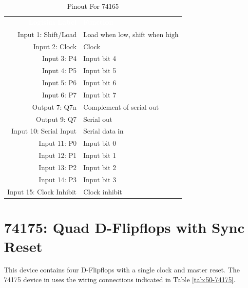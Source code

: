 \begin{table}[H]
	\sffamily
	\newcommand{\head}[1]{\textcolor{white}{\textbf{#1}}}		
	\begin{center}
		\begin{tabular}{rl} 
			\rowcolor{black!75}
			\head{Logisim Label} & \head{Function} \\
			Input 1: Shift/Load     & Load when low, shift when high \\
			Input 2: Clock          & Clock                          \\
			Input 3: P4             & Input bit 4                    \\
			Input 4: P5             & Input bit 5                    \\
			Input 5: P6             & Input bit 6                    \\
			Input 6: P7             & Input bit 7                    \\
			Output 7: Q7n           & Complement of serial out       \\
			Output 9: Q7            & Serial out                     \\
			Input 10: Serial Input  & Serial data in                 \\
			Input 11: P0            & Input bit 0                    \\
			Input 12: P1            & Input bit 1                    \\
			Input 13: P2            & Input bit 2                    \\
			Input 14: P3            & Input bit 3                    \\
			Input 15: Clock Inhibit & Clock inhibit                  \\
		\end{tabular}
	\end{center}
	\caption{Pinout For 74165}
	\label{tab:50-74165}
\end{table}


\section{74175: Quad D-Flipflops with Sync Reset}

This device contains four D-Flipflops with a single clock and master reset. The 74175 device in \LE uses the wiring connections indicated in Table \ref{tab:50-74175}.


